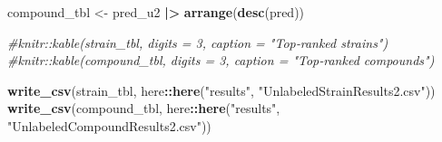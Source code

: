 \documentclass[
]{article}
\newenvironment{Shaded}{\begin{snugshade}}{\end{snugshade}}
\newcommand{\CommentTok}[1]{\textcolor[rgb]{0.56,0.35,0.01}{\textit{#1}}}
\newcommand{\FunctionTok}[1]{\textcolor[rgb]{0.13,0.29,0.53}{\textbf{#1}}}
\newcommand{\NormalTok}[1]{#1}
\newcommand{\OtherTok}[1]{\textcolor[rgb]{0.56,0.35,0.01}{#1}}
\newcommand{\SpecialCharTok}[1]{\textcolor[rgb]{0.81,0.36,0.00}{\textbf{#1}}}
\newcommand{\StringTok}[1]{\textcolor[rgb]{0.31,0.60,0.02}{#1}}
\begin{document}
\begin{Shaded}
\begin{Highlighting}[]
\NormalTok{compound\_tbl }\OtherTok{\textless{}{-}}\NormalTok{ pred\_u2 }\SpecialCharTok{|\textgreater{}}
  \FunctionTok{arrange}\NormalTok{(}\FunctionTok{desc}\NormalTok{(pred))}

\CommentTok{\#knitr::kable(strain\_tbl, digits = 3, caption = "Top‑ranked strains")}
\CommentTok{\#knitr::kable(compound\_tbl, digits = 3, caption = "Top‑ranked compounds")}

\FunctionTok{write\_csv}\NormalTok{(strain\_tbl,   here}\SpecialCharTok{::}\FunctionTok{here}\NormalTok{(}\StringTok{"results"}\NormalTok{, }\StringTok{"UnlabeledStrainResults2.csv"}\NormalTok{))}
\FunctionTok{write\_csv}\NormalTok{(compound\_tbl, here}\SpecialCharTok{::}\FunctionTok{here}\NormalTok{(}\StringTok{"results"}\NormalTok{, }\StringTok{"UnlabeledCompoundResults2.csv"}\NormalTok{))}
\end{Highlighting}
\end{Shaded}
\end{document}
